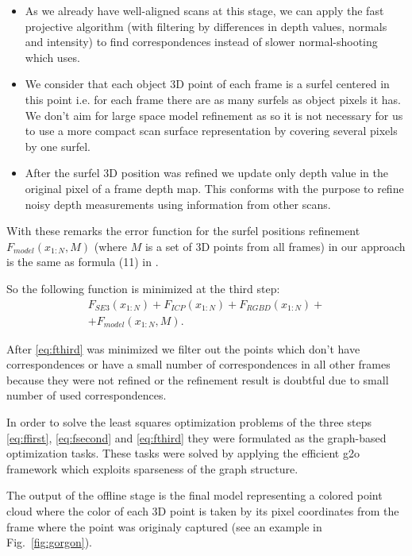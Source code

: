 \documentclass[letterpaper, 10 pt, conference]{ieeeconf}  %
\begin{document}
\begin{itemize}
 \item As we already have well-aligned scans at this stage, we can apply 
 the fast projective algorithm \cite{rusinkiewicz2001efficient} 
 (with filtering by differences in depth values, 
 normals and intensity) to find correspondences instead of slower
 normal-shooting which \cite{ruhnke2012highly} uses.
 \item We consider that each object 3D point of each frame is 
 a surfel centered in this point i.e. for each frame there are as many 
 surfels as object pixels it has. We don't aim for large space model refinement as \cite{ruhnke2012highly}
 so it is not necessary for us to use a more compact scan surface representation by covering several pixels 
 by one surfel.
 \item After the surfel 3D position was refined we update only depth value 
 in the original pixel of a frame depth map. This conforms with the purpose to 
 refine noisy depth measurements using information from other scans.
\end{itemize}

With these remarks the error function for the surfel positions refinement 
$F_{model}(x_{1:N}, M)$ (where $M$ is a set of 3D points from 
all frames) in our approach is the same as formula (11) in \cite{ruhnke2012highly}.

So the following function is minimized at the third step:
\begin{multline} \label{eq:fthird}
F_{SE3}(x_{1:N}) + F_{ICP}(x_{1:N}) + F_{RGBD}(x_{1:N}) + \\
+ F_{model}(x_{1:N}, M).
\end{multline}

After \eqref{eq:fthird} was minimized we filter out the points 
which don't have correspondences or have a small number of correspondences in
all other frames because they were not refined or the refinement result
is doubtful due to small number of used correspondences.

In order to solve the least squares optimization problems 
of the three steps \eqref{eq:ffirst}, \eqref{eq:fsecond} and \eqref{eq:fthird} 
they were formulated as the graph-based optimization tasks.
These tasks were solved by applying the efficient g2o framework 
\cite{kuemmerle2011g2o} which exploits sparseness of the graph structure.

The output of the offline stage is the final model representing
a colored point cloud where the color of each 3D point is taken 
by its pixel coordinates from the frame where the point was originaly 
captured (see an example in Fig.~\ref{fig:gorgon}).
\end{document}
